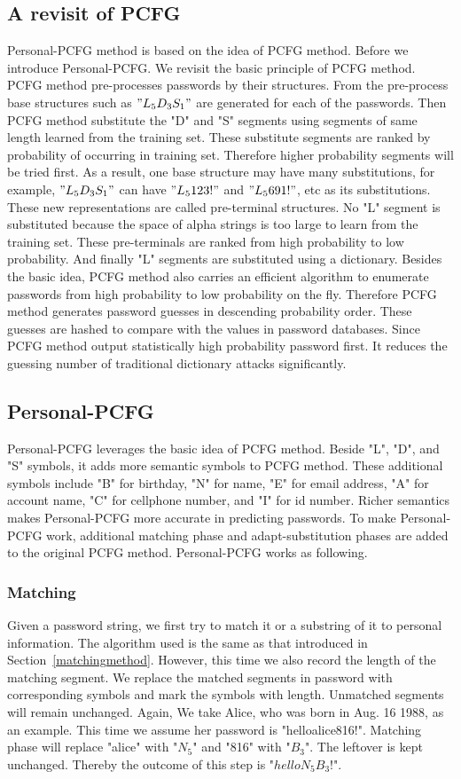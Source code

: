 \subsection{A revisit of PCFG}
Personal-PCFG method is based on the idea of PCFG method. Before we introduce Personal-PCFG. We revisit the basic principle of PCFG method. PCFG method pre-processes passwords by their structures. From the pre-process base structures such as $"L_5D_3S_1"$ are generated for each of the passwords. Then PCFG method substitute the "D" and "S" segments using segments of same length learned from the training set. These substitute segments are ranked by probability of occurring in training set. Therefore higher probability segments will be tried first. As a result, one base structure may have many substitutions, for example, $"L_5D_3S_1"$ can have $"L_5123!"$ and $"L_5691!"$, etc as its substitutions. These new representations are called pre-terminal structures. No "L" segment is substituted because the space of alpha strings is too large to learn from the training set. These pre-terminals are ranked from high probability to low probability. And finally "L" segments are substituted using a dictionary. Besides the basic idea, PCFG method also carries an efficient algorithm to enumerate passwords from high probability to low probability on the fly. Therefore PCFG method generates password guesses in descending probability order. These guesses are hashed to compare with the values in password databases. Since PCFG method output statistically high probability password first. It reduces the guessing number of traditional dictionary attacks significantly. 

\subsection{Personal-PCFG}
Personal-PCFG leverages the basic idea of PCFG method. Beside "L", "D", and "S" symbols, it adds more semantic symbols to PCFG method. These additional symbols include "B" for birthday, "N" for name, "E" for email address, "A" for account name, "C" for cellphone number, and "I" for id number. Richer semantics makes Personal-PCFG more accurate in predicting passwords. To make Personal-PCFG work, additional matching phase and adapt-substitution phases are added to the original PCFG method. Personal-PCFG works as following.
\subsubsection{Matching}
Given a password string, we first try to match it or a substring of it to personal information. The algorithm used is the same as that introduced in Section~\ref{matchingmethod}. However, this time we also record the length of the matching segment. We replace the matched segments in password with corresponding symbols and mark the symbols with length. Unmatched segments will remain unchanged. Again, We take Alice, who was born in Aug. 16 1988, as an example. This time we assume her password is "helloalice816!". Matching phase will replace "alice" with "$N_5$" and "816" with "$B_3$". The leftover is kept unchanged. Thereby the outcome of this step is "$helloN_5B_3!$". 
